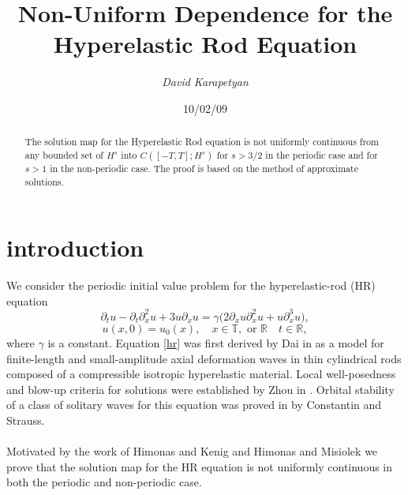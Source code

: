 \documentclass[12pt,reqno]{amsart}
\newcommand{\rr}{\mathbb{R}}
\newcommand{\p}{\partial}
\newcommand{\ci}{\mathbb{T}}
\theoremstyle{plain}  %
\theoremstyle{definition}
\begin{document}
\date{10/02/09}
\title{Non-Uniform Dependence for the
Hyperelastic Rod Equation}
\author{{\it David Karapetyan}}
\begin{abstract}
The solution map for the Hyperelastic Rod equation is not uniformly continuous
	from any bounded set of $H^s$ into $C([-T, T]; H^s)$
	for $s>3/2$ in the periodic case and for $s>1$ in the non-periodic case.
	The proof is based on the method of approximate solutions.
\end{abstract}
\maketitle
{}
\parindent0in
\parskip0.1in
%
%
\section{introduction}
\setcounter{equation}{0}
%
We consider the periodic initial value problem for
the hyperelastic-rod (HR)  equation
\begin{equation}
	\label{hr}
	\p_t u
	-
	\p_t \p_x^2 u
	+
	3u\p_x u
	=
	\gamma \big (
	2\p_x u \p_x^2 u
	+
	u \p_x^3 u
	\big ),
\end{equation}
\begin{equation}
	\label{hr-data} u(x, 0) = u_0 (x),
	\quad x  \in \ci, \text{  or  } \rr \quad t \in \rr,
\end{equation}
where $\gamma$ is a constant. Equation \ref{hr} was first
derived by Dai in \cite{d} as a model  for finite-length and
small-amplitude axial deformation waves in thin cylindrical
rods composed of a compressible isotropic hyperelastic
material. Local well-posedness and blow-up criteria for
solutions were established by  Zhou in \cite{z}. Orbital
stability of a class of solitary waves for this equation was
proved in \cite{cs} by Constantin and Strauss.
\\
\\
Motivated by the work of Himonas and Kenig \cite{hk} and
Himonas and  Misiolek \cite{hm} we prove that 
the solution map for the HR equation is not uniformly
continuous in both the periodic and non-periodic case.
%
\end{document}
